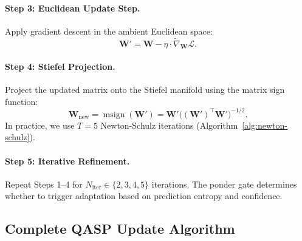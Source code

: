 \documentclass[twocolumn]{article}
\DeclareMathOperator{\msign}{msign}
\begin{document}
\paragraph{Step 3: Euclidean Update Step.}
Apply gradient descent in the ambient Euclidean space:
\begin{equation}
\mathbf{W}' = \mathbf{W} - \eta \cdot \widetilde{\nabla}_{\mathbf{W}} \mathcal{L}.
\label{eq:euclidean-step}
\end{equation}

\paragraph{Step 4: Stiefel Projection.}
Project the updated matrix onto the Stiefel manifold using the matrix sign function:
\begin{equation}
\mathbf{W}_{\mathrm{new}} = \msign(\mathbf{W}') = \mathbf{W}' \bigl((\mathbf{W}')^\top \mathbf{W}'\bigr)^{-1/2}.
\label{eq:stiefel-projection}
\end{equation}
In practice, we use $T = 5$ Newton-Schulz iterations (Algorithm~\ref{alg:newton-schulz}).

\paragraph{Step 5: Iterative Refinement.}
Repeat Steps 1--4 for $N_{\mathrm{iter}} \in \{2, 3, 4, 5\}$ iterations. The ponder gate determines whether to trigger adaptation based on prediction entropy and confidence.

\subsection{Complete QASP Update Algorithm}
\end{document}
